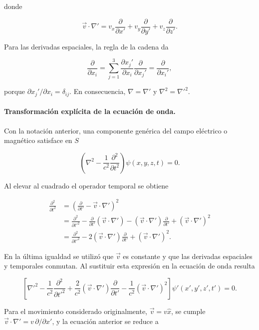donde

\[
    \vec{v}\cdot\nabla'
    =v_x\frac{\partial}{\partial x'}
    +v_y\frac{\partial}{\partial y'}
    +v_z\frac{\partial}{\partial z'}.
\]

Para las derivadas espaciales, la regla de la cadena da

\[
    \frac{\partial}{\partial x_i}
    =\sum_{j=1}^{3}
        \frac{\partial x_j'}{\partial x_i}
        \frac{\partial}{\partial x_j'}
    =\frac{\partial}{\partial x_i'},
\]

porque $\partial x_j'/\partial x_i=\delta_{ij}$. En consecuencia, $\nabla=\nabla'$ y $\nabla^2=\nabla'^2$.

\paragraph{Transformación explícita de la ecuación de onda.}
Con la notación anterior, una componente genérica del campo eléctrico o magnético satisface en $S$

\[
    \left(
        \nabla^2-\frac{1}{c^2}\frac{\partial^2}{\partial t^2}
    \right)\psi(x,y,z,t)=0.
\]

Al elevar al cuadrado el operador temporal se obtiene

\begin{align*}
    \frac{\partial^2}{\partial t^2}
    &=\left(
        \frac{\partial}{\partial t'}
        -\vec{v}\cdot\nabla'
    \right)^2 \\
    &=\frac{\partial^2}{\partial t'^2}
      -\frac{\partial}{\partial t'}
        (\vec{v}\cdot\nabla')
      -(\vec{v}\cdot\nabla')
        \frac{\partial}{\partial t'}
      +(\vec{v}\cdot\nabla')^2 \\
    &=\frac{\partial^2}{\partial t'^2}
      -2(\vec{v}\cdot\nabla')
        \frac{\partial}{\partial t'}
      +(\vec{v}\cdot\nabla')^2.
\end{align*}

En la última igualdad se utilizó que $\vec{v}$ es constante y que las derivadas espaciales y temporales conmutan. Al sustituir esta expresión en la ecuación de onda resulta

\[
    \left[
        \nabla'^2
        -\frac{1}{c^2}\frac{\partial^2}{\partial t'^2}
        +\frac{2}{c^2}(\vec{v}\cdot\nabla')
            \frac{\partial}{\partial t'}
        -\frac{1}{c^2}(\vec{v}\cdot\nabla')^2
    \right]\psi'(x',y',z',t')=0.
\]

Para el movimiento considerado originalmente, $\vec{v}=v\hat{x}$, se cumple $\vec{v}\cdot\nabla'=v\,\partial/\partial x'$, y la ecuación anterior se reduce a

